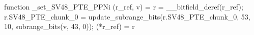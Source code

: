 function _set_SV48_PTE_PPNi (r_ref, v) = {
    r = __bitfield_deref(r_ref);
    r.SV48_PTE_chunk_0 = update_subrange_bits(r.SV48_PTE_chunk_0, 53, 10, subrange_bits(v, 43, 0));
    (*r_ref) = r
}
